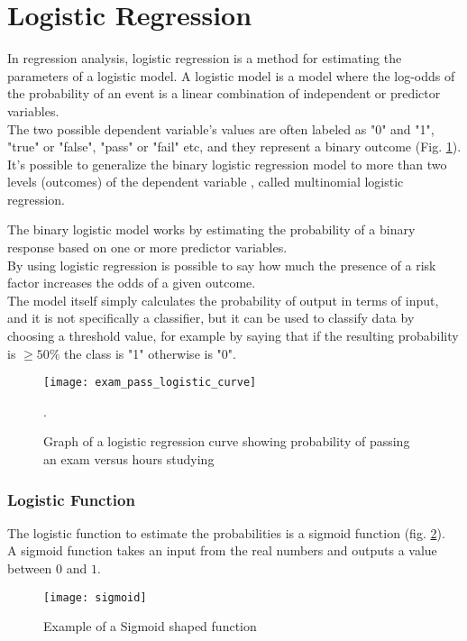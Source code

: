 \clearpage

\section{Logistic Regression} \label{logreg}
In regression analysis, logistic regression is a method for estimating the parameters of a logistic model. A logistic model is a model where the log-odds of the probability of an event is a linear combination of independent or predictor variables. \\
The two possible dependent variable's values are often labeled as "0" and "1", "true" or "false", "pass" or "fail" etc, and they represent a binary outcome (Fig. \ref{fig:logistic_exam}). \\
It's possible to generalize the binary logistic regression model to more than two levels (outcomes) of the dependent variable \cite{wiki:logisticreg}, called multinomial logistic regression.

The binary logistic model works by estimating the probability of a binary response based on one or more predictor variables.\\
By using logistic regression is possible to say how much the presence of a risk factor increases the odds of a given outcome. \\
The model itself simply calculates the probability of output in terms of input, and it is not specifically a classifier, but it can be used to classify data by choosing a threshold value, for example by saying that if the resulting probability is $\ge 50\%$ the class is "1" otherwise is "0".

\begin{figure}[H]
	\centering
	\texttt{[image: exam\_pass\_logistic\_curve]}
	\caption{Graph of a logistic regression curve showing probability of passing an exam versus hours studying \cite{wiki:logisticreg}}.
	\label{fig:logistic_exam}
\end{figure}

\subsubsection{Logistic Function}
The logistic function to estimate the probabilities is a sigmoid function (fig. \ref{fig:sigmoid}). \\
A sigmoid function takes an input from the real numbers and outputs a value between $0$ and $1$.

\begin{figure}[H]
	\centering
	\texttt{[image: sigmoid]}
	\caption{Example of a Sigmoid shaped function}
	\label{fig:sigmoid}
\end{figure}

